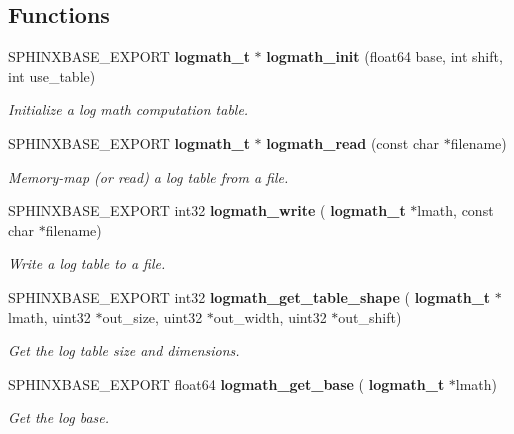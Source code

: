 \subsection*{Functions}
\begin{DoxyCompactItemize}
\item 
S\+P\+H\+I\+N\+X\+B\+A\+S\+E\+\_\+\+E\+X\+P\+O\+RT \textbf{ logmath\+\_\+t} $\ast$ \textbf{ logmath\+\_\+init} (float64 base, int shift, int use\+\_\+table)
\begin{DoxyCompactList}\small\item\em Initialize a log math computation table. \end{DoxyCompactList}\item 
\mbox{\label{logmath_8h_afbed298ba0bc4736415d78880fe5c7c2}} 
S\+P\+H\+I\+N\+X\+B\+A\+S\+E\+\_\+\+E\+X\+P\+O\+RT \textbf{ logmath\+\_\+t} $\ast$ \textbf{ logmath\+\_\+read} (const char $\ast$filename)
\begin{DoxyCompactList}\small\item\em Memory-\/map (or read) a log table from a file. \end{DoxyCompactList}\item 
\mbox{\label{logmath_8h_a787070f5e689878348ef219245fc7c44}} 
S\+P\+H\+I\+N\+X\+B\+A\+S\+E\+\_\+\+E\+X\+P\+O\+RT int32 \textbf{ logmath\+\_\+write} (\textbf{ logmath\+\_\+t} $\ast$lmath, const char $\ast$filename)
\begin{DoxyCompactList}\small\item\em Write a log table to a file. \end{DoxyCompactList}\item 
\mbox{\label{logmath_8h_a3280500e77bf27aa7cda23268b8eb8b3}} 
S\+P\+H\+I\+N\+X\+B\+A\+S\+E\+\_\+\+E\+X\+P\+O\+RT int32 \textbf{ logmath\+\_\+get\+\_\+table\+\_\+shape} (\textbf{ logmath\+\_\+t} $\ast$lmath, uint32 $\ast$out\+\_\+size, uint32 $\ast$out\+\_\+width, uint32 $\ast$out\+\_\+shift)
\begin{DoxyCompactList}\small\item\em Get the log table size and dimensions. \end{DoxyCompactList}\item 
\mbox{\label{logmath_8h_a6114206ec0321d7015c42fc7b81cb83e}} 
S\+P\+H\+I\+N\+X\+B\+A\+S\+E\+\_\+\+E\+X\+P\+O\+RT float64 \textbf{ logmath\+\_\+get\+\_\+base} (\textbf{ logmath\+\_\+t} $\ast$lmath)
\begin{DoxyCompactList}\small\item\em Get the log base. \end{DoxyCompactList}\item 

\end{DoxyCompactItemize}
